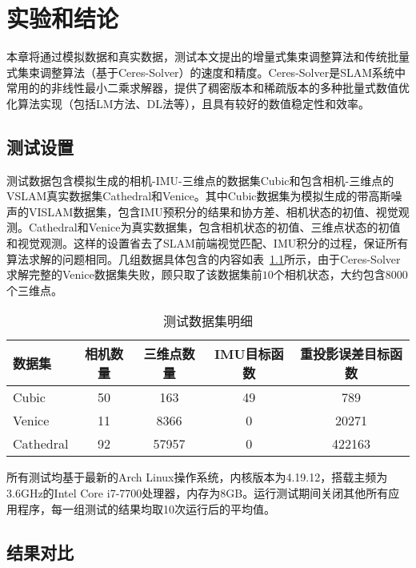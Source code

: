\chapter{实验和结论}\label{ch:exp}

本章将通过模拟数据和真实数据，测试本文提出的增量式集束调整算法和传统批量式集束调整算法（基于Ceres-Solver）的速度和精度。Ceres-Solver是SLAM系统中常用的的非线性最小二乘求解器，提供了稠密版本和稀疏版本的多种批量式数值优化算法实现（包括LM方法、DL法等），且具有较好的数值稳定性和效率。

\section{测试设置}

测试数据包含模拟生成的相机-IMU-三维点的数据集Cubic和包含相机-三维点的VSLAM真实数据集Cathedral\citep{kim2014influence}和Venice\citep{kummerle2011g}。其中Cubic数据集为模拟生成的带高斯噪声的VISLAM数据集，包含IMU预积分的结果和协方差、相机状态的初值、视觉观测。Cathedral和Venice为真实数据集，包含相机状态的初值、三维点状态的初值和视觉观测。这样的设置省去了SLAM前端视觉匹配、IMU积分的过程，保证所有算法求解的问题相同。几组数据具体包含的内容如表~\ref{tab:dataset}所示，由于Ceres-Solver求解完整的Venice数据集失败，顾只取了该数据集前$10$个相机状态，大约包含$8000$个三维点。

{
\linespread{1}
\begin{table}[htb!]
\caption{测试数据集明细}
\label{tab:dataset}
\centering
\begin{tabular}{l|cccc}
    \toprule
    数据集    & 相机数量 & 三维点数量 & IMU目标函数 & 重投影误差目标函数 \\ \midrule
    Cubic     &       50 &        163 &          49 &                789 \\
    Venice    &       11 &       8366 &           0 &              20271 \\
    Cathedral &       92 &      57957 &           0 &             422163 \\
    \bottomrule
\end{tabular}
\end{table}
}

所有测试均基于最新的Arch Linux操作系统，内核版本为4.19.12，搭载主频为3.6GHz的Intel Core i7-7700处理器，内存为8GB。运行测试期间关闭其他所有应用程序，每一组测试的结果均取10次运行后的平均值。

\section{结果对比}

